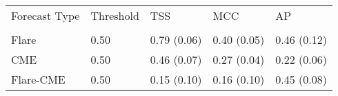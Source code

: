 \begin{tabular}{lllll}
\toprule
Forecast Type & Threshold & TSS & MCC & AP \\
 &  &  &  &  \\
\midrule
Flare & 0.50 & 0.79 (0.06) & 0.40 (0.05) & 0.46 (0.12) \\
CME & 0.50 & 0.46 (0.07) & 0.27 (0.04) & 0.22 (0.06) \\
Flare-CME & 0.50 & 0.15 (0.10) & 0.16 (0.10) & 0.45 (0.08) \\
\bottomrule
\end{tabular}
